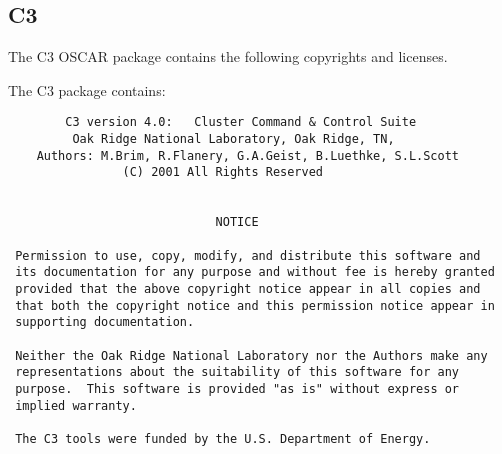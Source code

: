 %
%
%

\subsection{C3}
The C3 OSCAR package contains the following copyrights and licenses.

The C3 package contains:

\begin{verbatim}
        C3 version 4.0:   Cluster Command & Control Suite
         Oak Ridge National Laboratory, Oak Ridge, TN,
    Authors: M.Brim, R.Flanery, G.A.Geist, B.Luethke, S.L.Scott
                (C) 2001 All Rights Reserved


                             NOTICE

 Permission to use, copy, modify, and distribute this software and
 its documentation for any purpose and without fee is hereby granted
 provided that the above copyright notice appear in all copies and
 that both the copyright notice and this permission notice appear in
 supporting documentation.

 Neither the Oak Ridge National Laboratory nor the Authors make any
 representations about the suitability of this software for any
 purpose.  This software is provided "as is" without express or
 implied warranty.

 The C3 tools were funded by the U.S. Department of Energy.


\end{verbatim}


